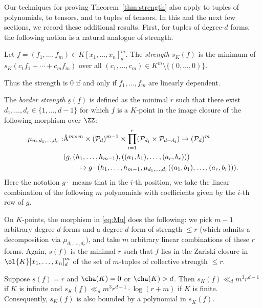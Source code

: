 \documentclass{amsart}
\newcommand{\cP}{\mathcal{P}}
\newcommand{\ul}[1]{\underline{#1}}
\begin{document}
Our techniques for proving Theorem~\ref{thm:strength} also apply to
tuples of polynomials, to tensors, and to tuples of tensors. In this
and the next few sections, we record these additional results. 
First, for tuples of degree-$d$ forms, the following notion is a natural 
analogue of strength.

\begin{de}
Let $\ul{f}=(f_1,\ldots,f_m) \in K[x_1,\ldots,x_n]_d^m$. The {\em
strength} $s_K(\ul{f})$ is the minimum of $s_K(c_1 f_1 + \cdots + c_m f_m)$
over all $(c_1,\ldots,c_m) \in K^m \setminus \{(0,\ldots,0)\}$.
\end{de}

Thus the strength is $0$ if and only if $f_1,\ldots,f_m$
are linearly dependent.

\begin{de}
The {\em border strength} $\ul{s}(\ul{f})$ is defined as the
minimal $r$ such that there exist $d_1,\ldots,d_r \in \{1,\ldots,d-1\}$
for which $\ul{f}$ is a $K$-point in the image closure of the following
morphism over $\ZZ$:
\begin{align} \label{eq:Mu}
\mu_{m,d_1,\ldots,d_r}:&\AA^{m \times m} \times (\cP_d)^{m-1} \times 
\prod_{i=1}^{r} (\cP_{d_i} \times
\cP_{d-d_i}) 
\to (\cP_d)^m   \\   
&(g,(h_1,\ldots,h_{m-1}),((a_1,b_1),\ldots,(a_r,b_r))) \notag \\
&\quad \quad \mapsto 
g \cdot
(h_1,\ldots,h_{m-1},\mu_{d_1,\ldots,d_r}((a_1,b_1),\ldots,(a_r,b_r)))
\notag.
\end{align}
Here the notation $g \cdot $ means that in the $i$-th position, we take
the linear combination of the following $m$ polynomials with coefficients
given by the $i$-th row of $g$.
\end{de}

On $K$-points, the morphism in \eqref{eq:Mu} does the following: we pick $m-1$
arbitrary degree-$d$ forms and a degree-$d$ form of strength $\leq r$ (which admits a
decomposition via $\mu_{d_1,\ldots,d_r})$, and take $m$ arbitrary linear
combinations of these $r$ forms. Again, $\ul{s}(\ul{f})$ is the minimal $r$
such that $\ul{f}$ lies in the Zariski closure in $\ol{K}[x_1,\ldots,x_n]_d^m$
of the set of $m$-tuples of collective strength $\leq r$.


\begin{thm} \label{thm:collectivestrength}
Suppose $\ul{s}(\ul{f}) =r$ and $\cha(K)=0$ or $\cha(K)>d$. Then $s_K(\ul{f}) \ll_d m^3r^{d-1}$ if
$K$ is infinite and $s_K(\ul{f}) \ll_d 
m^3r^{d-1} \cdot \log(r+m)$ if $K$ is finite. Consequently,
$s_K(\ul{f})$ is also bounded by a polynomial in $s_{\overline{K}}(\ul{f})$.
\end{thm}
\end{document}
